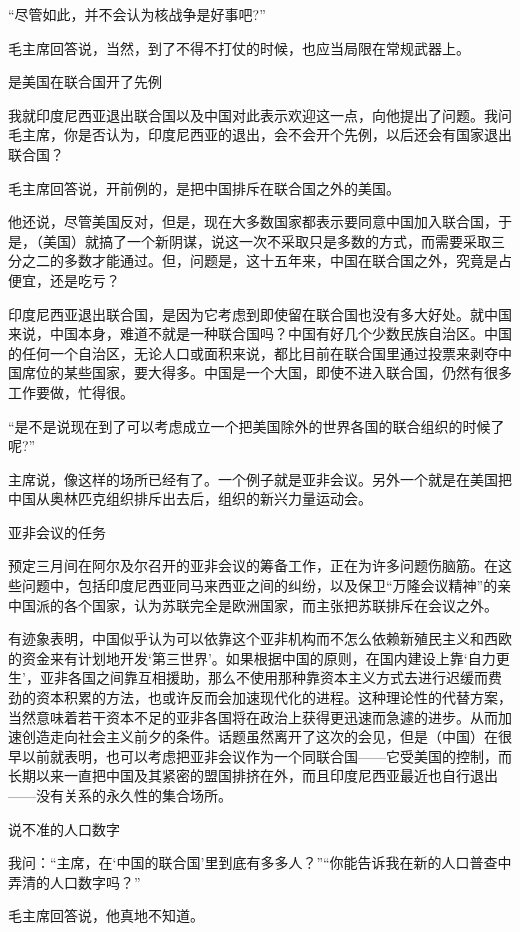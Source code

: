 “尽管如此，并不会认为核战争是好事吧?”

毛主席回答说，当然，到了不得不打仗的时候，也应当局限在常规武器上。

是美国在联合国开了先例

我就印度尼西亚退出联合国以及中国对此表示欢迎这一点，向他提出了问题。我问毛主席，你是否认为，印度尼西亚的退出，会不会开个先例，以后还会有国家退出联合国？

毛主席回答说，开前例的，是把中国排斥在联合国之外的美国。

他还说，尽管美国反对，但是，现在大多数国家都表示要同意中国加入联合国，于是，（美国）就搞了一个新阴谋，说这一次不采取只是多数的方式，而需要采取三分之二的多数才能通过。但，问题是，这十五年来，中国在联合国之外，究竟是占便宜，还是吃亏？

印度尼西亚退出联合国，是因为它考虑到即使留在联合国也没有多大好处。就中国来说，中国本身，难道不就是一种联合国吗？中国有好几个少数民族自治区。中国的任何一个自治区，无论人口或面积来说，都比目前在联合国里通过投票来剥夺中国席位的某些国家，要大得多。中国是一个大国，即使不进入联合国，仍然有很多工作要做，忙得很。

“是不是说现在到了可以考虑成立一个把美国除外的世界各国的联合组织的时候了呢?”

主席说，像这样的场所已经有了。一个例子就是亚非会议。另外一个就是在美国把中国从奥林匹克组织排斥出去后，组织的新兴力量运动会。

亚非会议的任务

预定三月间在阿尔及尔召开的亚非会议的筹备工作，正在为许多问题伤脑筋。在这些问题中，包括印度尼西亚同马来西亚之间的纠纷，以及保卫“万隆会议精神”的亲中国派的各个国家，认为苏联完全是欧洲国家，而主张把苏联排斥在会议之外。

有迹象表明，中国似乎认为可以依靠这个亚非机构而不怎么依赖新殖民主义和西欧的资金来有计划地开发‘第三世界’。如果根据中国的原则，在国内建设上靠‘自力更生’，亚非各国之间靠互相援助，那么不使用那种靠资本主义方式去进行迟缓而费劲的资本积累的方法，也或许反而会加速现代化的进程。这种理论性的代替方案，当然意味着若干资本不足的亚非各国将在政治上获得更迅速而急遽的进步。从而加速创造走向社会主义前夕的条件。话题虽然离开了这次的会见，但是（中国）在很早以前就表明，也可以考虑把亚非会议作为一个同联合国——它受美国的控制，而长期以来一直把中国及其紧密的盟国排挤在外，而且印度尼西亚最近也自行退出——没有关系的永久性的集合场所。

说不准的人口数字

我问：“主席，在‘中国的联合国’里到底有多多人？”“你能告诉我在新的人口普查中弄清的人口数字吗？”

毛主席回答说，他真地不知道。

